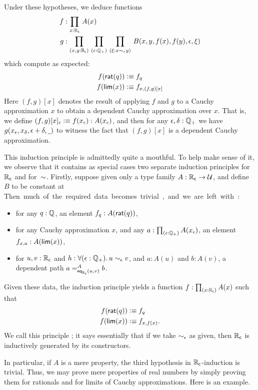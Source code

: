 Under these hypotheses, we deduce functions
\begin{align*}
  f&:\prd{x:\RC} A(x)\\
  g&:\prd{x,y:\RC}{\epsilon:\Qp}{\xi:x\close{\epsilon} y} B(x,y,f(x),f(y),\epsilon,\xi)
\end{align*}
which compute as expected:
\begin{align*}
  f(\rcrat(q)) &\defeq f_q\\
  f(\rclim(x)) &\defeq f_{x,(f,g)[x]}
\end{align*}
Here $(f,g)[x]$ denotes the result of applying $f$ and $g$ to a Cauchy approximation $x$ to obtain a dependent Cauchy approximation over $x$.
That is, we define $(f,g)[x]_\epsilon \defeq f(x_\epsilon) : A(x_\epsilon)$, and then for any $\epsilon,\delta:\Qp$ we have $g(x_\epsilon,x_\delta,\epsilon+\delta,\blank)$ to witness the fact that $(f,g)[x]$ is a dependent Cauchy approximation.

This induction principle is admittedly quite a mouthful.
To help make sense of it, we observe that it contains as special cases two separate induction principles for~$\RC$ and for~$\closesym$.
Firstly, suppose given only a type family $A:\RC\to\type$, and define $B$ to be constant at \unit.
Then much of the required data becomes trivial, and we are left with:
\begin{itemize}
\item for any $q : \Q$, an element $f_q:A(\rcrat(q))$,
\item for any Cauchy approximation $x$, and any $a:\prd{\epsilon:\Qp} A(x_\epsilon)$, an element $f_{x,a}:A(\rclim(x))$,
\item for $u, v : \RC$ and $h:\fall{\epsilon : \Qp} u \close\epsilon v$, and $a:A(u)$ and $b:A(v)$, a dependent path $\dpath{A}{\rceq(u,v)}{a}{b}$.
\end{itemize}
Given these data, the induction principle yields a function $f:\prd{x:\RC} A(x)$ such that
\begin{align*}
  f(\rcrat(q)) &\defeq f_q\\
  f(\rclim(x)) &\defeq f_{x,f(x)}.
\end{align*}
We call this principle ; it says essentially that if we take $\close\epsilon$ as given, then $\RC$ is inductively generated by its constructors.

In particular, if $A$ is a mere property, the third hypothesis in $\RC$-induction is trivial.
Thus, we may prove mere properties of real numbers by simply proving them for rationals and for limits of Cauchy approximations.
Here is an example.

